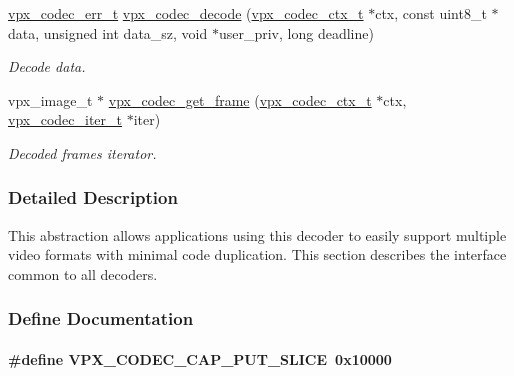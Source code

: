 \begin{DoxyCompactItemize}
\hyperlink{group__codec_gada1084710837ad363b92f2379dd2b8d2}{vpx\-\_\-codec\-\_\-err\-\_\-t} \hyperlink{group__decoder_ga3441e157a7a69108bca9a069f2ee8e0d}{vpx\-\_\-codec\-\_\-decode} (\hyperlink{group__codec_gad03e2dfa6ae511db7d25be6bbb336233}{vpx\-\_\-codec\-\_\-ctx\-\_\-t} $\ast$ctx, const uint8\-\_\-t $\ast$data, unsigned int data\-\_\-sz, void $\ast$user\-\_\-priv, long deadline)
\begin{DoxyCompactList}\small\item\em \-Decode data. \end{DoxyCompactList}\item 
vpx\-\_\-image\-\_\-t $\ast$ \hyperlink{group__decoder_ga0e231c3a5ce445fdb2268d741da97500}{vpx\-\_\-codec\-\_\-get\-\_\-frame} (\hyperlink{group__codec_gad03e2dfa6ae511db7d25be6bbb336233}{vpx\-\_\-codec\-\_\-ctx\-\_\-t} $\ast$ctx, \hyperlink{group__codec_ga6ea348f76b1f8a1fe50e14db684146c6}{vpx\-\_\-codec\-\_\-iter\-\_\-t} $\ast$iter)
\begin{DoxyCompactList}\small\item\em \-Decoded frames iterator. \end{DoxyCompactList}\end{DoxyCompactItemize}


\subsubsection{\-Detailed \-Description}
\-This abstraction allows applications using this decoder to easily support multiple video formats with minimal code duplication. \-This section describes the interface common to all decoders. 

\subsubsection{\-Define \-Documentation}
\hypertarget{group__decoder_ga9e33b8ee81025d5fc3d01b0975ad5f96}{
\paragraph[{\-V\-P\-X\-\_\-\-C\-O\-D\-E\-C\-\_\-\-C\-A\-P\-\_\-\-P\-U\-T\-\_\-\-S\-L\-I\-C\-E}]{\setlength{\rightskip}{0pt plus 5cm}\#define {\bf \-V\-P\-X\-\_\-\-C\-O\-D\-E\-C\-\_\-\-C\-A\-P\-\_\-\-P\-U\-T\-\_\-\-S\-L\-I\-C\-E}~0x10000}}\label{group__decoder_ga9e33b8ee81025d5fc3d01b0975ad5f96}


